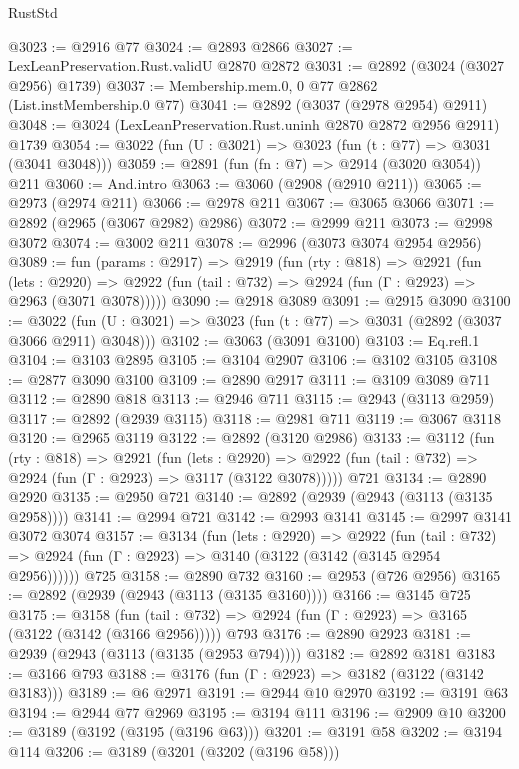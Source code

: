 \begin{lexlean}{RustStd}
\begin{coremodule}
@3023 := @2916 @77
@3024 := @2893 @2866
@3027 := LexLeanPreservation.Rust.validU @2870 @2872
@3031 := @2892 (@3024 (@3027 @2956) @1739)
@3037 := Membership.mem.{0, 0} @77 @2862 (List.instMembership.{0} @77)
@3041 := @2892 (@3037 (@2978 @2954) @2911)
@3048 := @3024 (LexLeanPreservation.Rust.uninh @2870 @2872 @2956 @2911) @1739
@3054 := @3022 (fun (U : @3021) => @3023 (fun (t : @77) => @3031 (@3041 @3048)))
@3059 := @2891 (fun (fn : @7) => @2914 (@3020 @3054)) @211
@3060 := And.intro
@3063 := @3060 (@2908 (@2910 @211))
@3065 := @2973 (@2974 @211)
@3066 := @2978 @211
@3067 := @3065 @3066
@3071 := @2892 (@2965 (@3067 @2982) @2986)
@3072 := @2999 @211
@3073 := @2998 @3072
@3074 := @3002 @211
@3078 := @2996 (@3073 @3074 @2954 @2956)
@3089 := fun (params : @2917) =>
  @2919
    (fun (rty : @818) =>
    @2921
      (fun (lets : @2920) =>
      @2922 (fun (tail : @732) => @2924 (fun (Γ : @2923) => @2963 (@3071 @3078)))))
@3090 := @2918 @3089
@3091 := @2915 @3090
@3100 := @3022 (fun (U : @3021) => @3023 (fun (t : @77) => @3031 (@2892 (@3037 @3066 @2911) @3048)))
@3102 := @3063 (@3091 @3100)
@3103 := Eq.refl.{1}
@3104 := @3103 @2895
@3105 := @3104 @2907
@3106 := @3102 @3105
@3108 := @2877 @3090 @3100
@3109 := @2890 @2917
@3111 := @3109 @3089 @711
@3112 := @2890 @818
@3113 := @2946 @711
@3115 := @2943 (@3113 @2959)
@3117 := @2892 (@2939 @3115)
@3118 := @2981 @711
@3119 := @3067 @3118
@3120 := @2965 @3119
@3122 := @2892 (@3120 @2986)
@3133 := @3112
    (fun (rty : @818) =>
    @2921
      (fun (lets : @2920) =>
      @2922 (fun (tail : @732) => @2924 (fun (Γ : @2923) => @3117 (@3122 @3078)))))
    @721
@3134 := @2890 @2920
@3135 := @2950 @721
@3140 := @2892 (@2939 (@2943 (@3113 (@3135 @2958))))
@3141 := @2994 @721
@3142 := @2993 @3141
@3145 := @2997 @3141 @3072 @3074
@3157 := @3134
    (fun (lets : @2920) =>
    @2922
      (fun (tail : @732) => @2924 (fun (Γ : @2923) => @3140 (@3122 (@3142 (@3145 @2954 @2956))))))
    @725
@3158 := @2890 @732
@3160 := @2953 (@726 @2956)
@3165 := @2892 (@2939 (@2943 (@3113 (@3135 @3160))))
@3166 := @3145 @725
@3175 := @3158
    (fun (tail : @732) => @2924 (fun (Γ : @2923) => @3165 (@3122 (@3142 (@3166 @2956)))))
    @793
@3176 := @2890 @2923
@3181 := @2939 (@2943 (@3113 (@3135 (@2953 @794))))
@3182 := @2892 @3181
@3183 := @3166 @793
@3188 := @3176 (fun (Γ : @2923) => @3182 (@3122 (@3142 @3183)))
@3189 := @6 @2971
@3191 := @2944 @10 @2970
@3192 := @3191 @63
@3194 := @2944 @77 @2969
@3195 := @3194 @111
@3196 := @2909 @10
@3200 := @3189 (@3192 (@3195 (@3196 @63)))
@3201 := @3191 @58
@3202 := @3194 @114
@3206 := @3189 (@3201 (@3202 (@3196 @58)))

\end{coremodule}
\end{lexlean}
